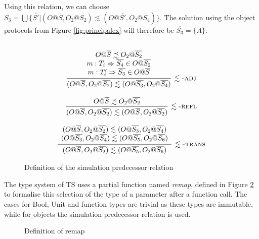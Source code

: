 \documentclass[preprint]{sigplanconf}
\makeatletter
\newcommand{\figref}[1]{Figure \ref{#1}}
\newcommand{\ot}[2]{#1@\overline{#2}}
\makeatother
\begin{document}
Using this relation, we can choose $\overline{S_3} = 
\bigcup \{ \overline{S'} | 
  (\ot{O}{S} , \ot{O_2}{S_2}) \lesssim (\ot{O}{S'}, \ot{O_2}{S_4})
\}$. The solution using the object protocols from \figref{fig:principalex}
will therefore be $\overline{S_3} = \{ A \}$.

\begin{figure}

\[
\begin{array}{c}
\\
\infer[\lesssim\textsc{-adj}]
  {(O@\overline{S}, O_2@\overline{S_2}) \lesssim (O@\overline{S_3}, O_2@\overline{S_4})}
  {
    \begin{array}{cc}
    O@\overline{S} \precsim O_2@\overline{S_2}
    \\
    m : T_i \Rightarrow \overline{S_4} \in O@\overline{S_2}
    \\
    m : T_i' \Rightarrow \overline{S_3} \in O@\overline{S}
    \end{array}
  }
\\\\
\infer[\lesssim\textsc{-refl}]
  {(O@\overline{S}, O_2@\overline{S_2}) \lesssim (O@\overline{S}, O_2@\overline{S_2})}
  {O@\overline{S} \precsim O_2@\overline{S_2}}
\\\\
\infer[\lesssim\textsc{-trans}]
  {
  (O@\overline{S}, O_2@\overline{S_2}) \lesssim (O@\overline{S_5}, O_2@\overline{S_6})
  }
  {
  \begin{array}{c}
  (O@\overline{S}, O_2@\overline{S_2}) \lesssim (O@\overline{S_3}, O_2@\overline{S_4})
  \\
  (O@\overline{S_3}, O_2@\overline{S_4}) \lesssim (O@\overline{S_5}, O_2@\overline{S_6})
  \end{array}
  }
\end{array}
\]
\caption{\label{fig:simreach} Definition of the simulation predecessor relation}
\end{figure}

The type system of TS uses a partial function named {\it remap}, defined in
\figref{fig:remaprules} to formalise
this selection of the type of a parameter after a function call. The cases
for Bool, Unit and function types are trivial as these types are immutable,
while for objects the simulation predecessor relation is used.

\begin{figure}
\ottdefnremap

\caption{\label{fig:remaprules} Definition of remap}
\end{figure}
\end{document}
